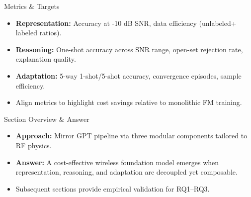 \begin{frame}{Metrics \& Targets}
    \begin{itemize}
        \item \textbf{Representation:} Accuracy at -10 dB SNR, data efficiency (unlabeled+ labeled ratios).
        \item \textbf{Reasoning:} One-shot accuracy across SNR range, open-set rejection rate, explanation quality.
        \item \textbf{Adaptation:} 5-way 1-shot/5-shot accuracy, convergence episodes, sample efficiency.
        \item Align metrics to highlight cost savings relative to monolithic FM training.
    \end{itemize}
\end{frame}

\begin{frame}{Section Overview \& Answer}
    \begin{itemize}
        \item \textbf{Approach:} Mirror GPT pipeline via three modular components tailored to RF physics.
        \item \textbf{Answer:} A cost-effective wireless foundation model emerges when representation, reasoning, and adaptation are decoupled yet composable.
        \item Subsequent sections provide empirical validation for RQ1–RQ3.
    \end{itemize}
\end{frame}

